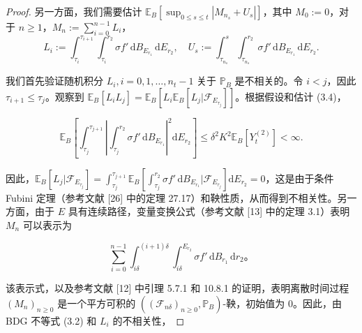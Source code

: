 \begin{proof}
	另一方面，我们需要估计 $\mathbb{E}_B \left[\sup_{0 \leq s \leq t} |M_{n_s} + U_s|\right]$，其中 $M_0 := 0$，对于 $n \geq 1$，$M_n := \sum_{i=0}^{n-1} L_i$，
	$$
	L_i := \int_{\tau_i}^{\tau_{i+1}} \int_{\tau_i}^{r_2} \sigma f' \, \mathrm{d}B_{E_{r_1}} \, \mathrm{d}E_{r_2}, \quad U_s := \int_{\tau_{n_s}}^s \int_{\tau_{n_s}}^{r_2} \sigma f' \, \mathrm{d}B_{E_{r_1}} \, \mathrm{d}E_{r_2}.
	$$
	
	我们首先验证随机积分 $L_i, i=0,1,\ldots,n_t-1$ 关于 $\mathbb{P}_B$ 是不相关的。令 $i < j$，因此 $\tau_{i+1} \leq \tau_j$。观察到 $\mathbb{E}_B [L_i L_j] = \mathbb{E}_B \left[L_i \mathbb{E}_B [L_j | \mathcal{F}_{E_{\tau_j}}]\right]$。根据假设和估计 (3.4)，
	
	$$
	\mathbb{E}_B \left[\int_{\tau_j}^{\tau_{j+1}} \left|\int_{\tau_j}^{r_2} \sigma f'\, \mathrm{d}B_{E_{r_1}}\right|^2 \mathrm{d}E_{r_2}\right] \leq \delta^2 K^2 \mathbb{E}_B [Y_t^{(2)}] < \infty.
	$$
	
	因此，$\mathbb{E}_B \left[L_j | \mathcal{F}_{E_{\tau_j}}\right] = \int_{\tau_j}^{\tau_{j+1}} \mathbb{E}_B \left[\int_{\tau_j}^{r_2} \sigma f'  \, \mathrm{d}B_{E_{r_1}} | \mathcal{F}_{E_{\tau_j}}\right] \mathrm{d}E_{r_2} = 0$，这是由于条件 Fubini 定理（参考文献 [26] 中的定理 27.17）和鞅性质，从而得到不相关性。另一方面，由于 $E$ 具有连续路径，变量变换公式（参考文献 [13] 中的定理 3.1）表明 $M_n$ 可以表示为
	
	$$
	\sum_{i=0}^{n-1} \int_{i\delta}^{(i+1)\delta} \int_{i\delta}^{E_{r_2}} \sigma f' \, \mathrm{d}B_{r_1} \, \mathrm{d}r_2。
	$$
	
	该表示式，以及参考文献 [12] 中引理 5.7.1 和 10.8.1 的证明，表明离散时间过程 $(M_n)_{n \geq 0}$ 是一个平方可积的 $((\mathcal{F}_{n\delta})_{n \geq 0}, \mathbb{P}_B)$-鞅，初始值为 0。因此，由 BDG 不等式 (3.2) 和 $L_i$ 的不相关性，
	

\end{proof}
